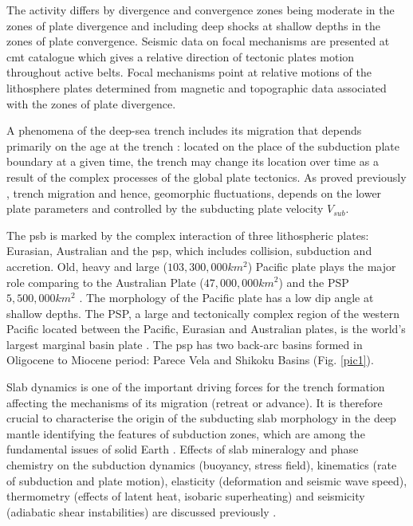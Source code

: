 \documentclass{rrparticle}
\begin{document}
The activity differs by divergence and convergence zones being moderate in the zones of plate divergence and including deep shocks at shallow depths in the zones of plate convergence. Seismic data on focal mechanisms are presented at \ac{cmt} catalogue which gives a relative direction of tectonic plates motion throughout active belts. Focal mechanisms point at relative motions of the lithosphere plates determined from magnetic and topographic data associated with the zones of plate divergence.

A phenomena of the deep-sea trench includes its migration that depends primarily on the age at the trench \cite{Faccenna,Gutscher}: located on the place of the subduction plate boundary at a given time, the trench may change its location over time as a result of the complex processes of the global plate tectonics. As proved previously \cite{Lallemand}, trench migration and hence, geomorphic fluctuations, depends on the lower plate parameters and controlled by the subducting plate velocity $V_{sub}$.
	
The \ac{psb} is marked by the complex interaction of three lithospheric plates: Eurasian, Australian and the \ac{psp}, which includes collision, subduction and accretion. Old, heavy and large ($103,300,000 km^2$) Pacific plate plays the major role comparing to the Australian Plate ($47,000,000 km^2$) and the PSP $5,500,000 km^2$ \cite{Alden}. The morphology of the Pacific plate has a low dip angle at shallow depths. The PSP, a large and tectonically complex region of the western Pacific located between the Pacific, Eurasian and Australian plates, is the world’s largest marginal basin plate \cite{Sdrolias}. The \ac{psp} has two back-arc basins formed in Oligocene to Miocene period: Parece Vela and Shikoku Basins (Fig. \ref{pic1}). 

Slab dynamics is one of the important driving forces for the trench formation affecting the mechanisms of its migration (retreat or advance). It is therefore crucial to characterise the origin of the subducting slab morphology in the deep mantle identifying the features of subduction zones, which are among the fundamental issues of solid Earth \cite{Yoshida}. Effects of slab mineralogy and phase chemistry on the subduction dynamics (buoyancy, stress field), kinematics (rate of subduction and plate motion), elasticity (deformation and seismic wave speed), thermometry (effects of latent heat, isobaric superheating) and seismicity (adiabatic shear instabilities) are discussed previously \cite{Bina}. 
\end{document}
